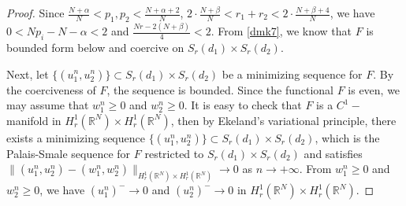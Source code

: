 \documentclass[10pt,a4paper]{amsart}
\numberwithin{equation}{section}
\begin{document}
\begin{proof}
Since $\frac{N+\alpha}{N}<p_1,p_2<\frac{N+\alpha+2}{N}$, 
$2\cdot\frac{N+\beta}{N}<r_1+r_2<2\cdot\frac{N+\beta+4}{N}$, we have $0<Np_i-N-\alpha<2$ 
and $\frac{Nr-2(N+\beta)}{4}<2$.
From \eqref{dmk7}, we know that $F$ is bounded form below and coercive on 
$S_{r}(d_1)\times S_{r}(d_2)$.

Next, let $\{(u_1^n,u_2^n)\}\subset S_{r}(d_1)\times S_{r}(d_2)$ be a minimizing 
sequence for $F$. By the coerciveness of $F$, the sequence is
bounded. Since the functional $F$ is even, we may assume that $w_1^n\geq0$ and 
$w_2^n\geq0$. It is easy to check that $F$ is a $C^1-$manifold in
$H_r^1(\mathbb{R}^N)\times H_r^1(\mathbb{R}^N)$, then by Ekeland's variational 
principle, there exists a minimizing sequence
$\{(u_1^n,u_2^n)\}\subset S_{r}(d_1)\times S_{r}(d_2)$, which is the Palais-Smale 
sequence for $F$ restricted to $S_{r}(d_1)\times S_{r}(d_2)$ and satisfies
$\| (u_1^n,u_2^n)-(w_1^n,w_2^n)\|_{H_r^1(\mathbb{R}^N)\times H_r^1(\mathbb{R}^N)}\to 0$ 
as $n\to +\infty$.
From $w_1^n\geq0$ and $w_2^n\geq0$, we have $(u_1^n)^-\to 0$ and $(u_2^n)^-\to 0$ in 
$H_r^1(\mathbb{R}^N)\times H_r^1(\mathbb{R}^N)$.
\end{proof}
\end{document}
